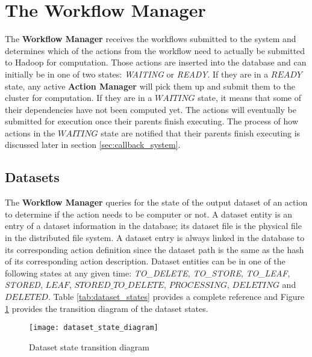 \section{The Workflow Manager}
The \textbf{Workflow Manager} receives the workflows submitted to the system and determines which of the actions from the workflow need to actually be submitted to Hadoop for computation. Those actions are inserted into the database and can initially be in one of two states: \textit{WAITING} or \textit{READY}. If they are in a $READY$ state, any active \textbf{Action Manager} will pick them up and submit them to the cluster for computation. If they are in a $WAITING$ state, it means that some of their dependencies have not been computed yet. The actions will eventually be submitted for execution once their parents finish executing. The process of how actions in the $WAITING$ state are notified that their parents finish executing is discussed later in section \ref{sec:callback_system}.

\subsection{Datasets}
The \textbf{Workflow Manager} queries for the state of the output dataset of an action to determine if the action needs to be computer or not.  A dataset entity is an entry of a dataset information in the database; its dataset file is the physical file in the distributed file system. A dataset entry is always linked in the database to its corresponding action definition since the dataset path is the same as the hash of its corresponding action description. Dataset entities can be in one of the following states at any given time: \textit{TO\_DELETE}, \textit{TO\_STORE}, \textit{TO\_LEAF}, \textit{STORED}, $LEAF$, $STORED\_TO\_DELETE$, $PROCESSING$, $DELETING$ and $DELETED$. Table \ref{tab:dataset_states} provides a complete reference and Figure \ref{fig:dataset_transition_diagram} provides the transition diagram of the dataset states.


\begin{figure}
\centering
\texttt{[image: dataset\_state\_diagram]}
\caption{Dataset state transition diagram}
\label{fig:dataset_transition_diagram}
\end{figure}

